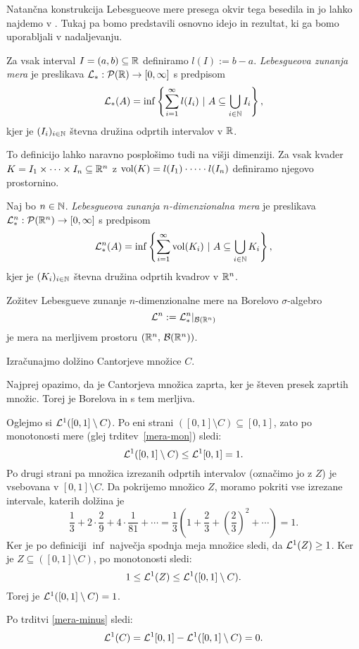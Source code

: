 Natančna konstrukcija Lebesgueove mere presega okvir tega besedila in jo lahko najdemo v \cite[poglavje 1]{mb-otm}. Tukaj pa bomo predstavili osnovno idejo in rezultat, ki ga bomo uporabljali v nadaljevanju.

\begin{definicija}
    Za vsak interval \(I = (a, b) \subseteq \mathbb{R}\) definiramo \(l(I) := b -a\). \emph{Lebesgueova zunanja mera} je preslikava \(\mathcal{L}_*: \mathcal{P}(\mathbb{R}) \to [0, \infty]\) s predpisom 
    \[\mathcal{L}_*(A) = \inf \left\{\sum_{i=1}^{\infty} l(I_i) \ | \ A \subseteq \bigcup_{i \in \mathbb{N}} I_i\right\},\]
    kjer je \((I_i)_{i \in \mathbb{N}}\) števna družina odprtih intervalov v \(\mathbb{R}\).
\end{definicija}

To definicijo lahko naravno posplošimo tudi na višji dimenziji. Za vsak kvader \(K = I_1 \times \cdots \times I_n \subseteq \mathbb{R}^n\) z \(\operatorname{vol}(K) = l(I_1) \cdot \cdots \cdot l(I_n)\) definiramo njegovo prostornino.

\begin{definicija}
    Naj bo \(n \in \mathbb{N}\). \emph{Lebesgueova zunanja \(n\)-dimenzionalna mera} je preslikava \(\mathcal{L}_*^n: \mathcal{P}(\mathbb{R}^n) \to [0, \infty]\) s predpisom 
    \[\mathcal{L}_*^n(A) = \inf \left\{\sum_{i=1}^{\infty} \operatorname{vol}(K_i) \ | \ A \subseteq \bigcup_{i \in \mathbb{N}} K_i\right\},\]
    kjer je \((K_i)_{i \in \mathbb{N}}\) števna družina odprtih kvadrov v \(\mathbb{R}^n\).
\end{definicija}

\begin{trditev}
    Zožitev Lebesgueve zunanje \(n\)-dimenzionalne mere na Borelovo \(\sigma\)-algebro
    \[\mathcal{L}^n := \mathcal{L}_*^n|_{\mathcal{B}(\mathbb{R}^n)}\] je mera na merljivem prostoru \((\mathbb{R}^n,\, \mathcal{B}(\mathbb{R}^n))\).
\end{trditev}

\begin{zgled}
    Izračunajmo dolžino Cantorjeve množice \(C\). 
    
    Najprej opazimo, da je Cantorjeva množica zaprta, ker je števen presek zaprtih množic. Torej je Borelova in s tem merljiva.
    
    Oglejmo si \(\mathcal{L}^1([0,1] \setminus C)\). 
    Po eni strani \(([0,1] \setminus C) \subseteq [0, 1]\), zato po monotonosti mere (glej trditev~\ref{mera-mon}) sledi:
    \[\mathcal{L}^1([0,1] \setminus C) \leq \mathcal{L}^1[0,1] = 1.\] 
    Po drugi strani pa množica izrezanih odprtih intervalov (označimo jo z \(Z\)) je vsebovana v \([0,1] \setminus C\). Da pokrijemo množico \(Z\), moramo pokriti vse izrezane intervale, katerih dolžina je
    \[\frac{1}{3} + 2 \cdot \frac{2}{9} + 4 \cdot \frac{1}{81} + \cdots = \frac{1}{3}\left(1 + \frac{2}{3} + \left(\frac{2}{3}\right)^2 + \cdots \right) = 1.\]
    Ker je po definiciji \(\inf\) največja spodnja meja množice sledi, da \(\mathcal{L}^1(Z) \geq 1\). Ker je \(Z \subseteq ([0,1] \setminus C)\), po monotonosti sledi:
    \[1 \leq \mathcal{L}^1(Z) \leq \mathcal{L}^1([0,1] \setminus C).\]
    Torej je  \(\mathcal{L}^1([0,1] \setminus C) = 1\). 
    
    Po trditvi \ref{mera-minus} sledi:
    \[\mathcal{L}^1(C)  = \mathcal{L}^1[0,1] - \mathcal{L}^1([0,1] \setminus C) = 0.\]
\end{zgled}

